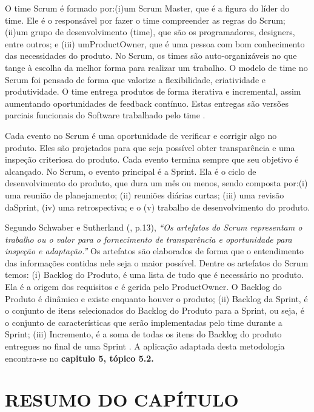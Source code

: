 O time Scrum é formado por:(i)um Scrum Master, que é a figura do líder do time. Ele é o responsável por fazer o time compreender as regras do Scrum; (ii)um grupo de desenvolvimento (time), que são os programadores, designers, entre outros; e (iii) umProductOwner, que é uma pessoa com bom conhecimento das necessidades do produto. No Scrum, os times são auto-organizáveis no que tange à escolha da melhor forma para realizar um trabalho. O modelo de time no Scrum foi pensado de forma que valorize a flexibilidade, criatividade e produtividade.  O time entrega produtos de forma iterativa e incremental, assim aumentando oportunidades de feedback contínuo. Estas entregas são versões parciais funcionais do Software trabalhado pelo time \cite[p. 5-7]{schwaber2013}.

Cada evento no Scrum é uma oportunidade de verificar e corrigir algo no produto. Eles são projetados para que seja possível obter transparência e uma inspeção criteriosa do produto. Cada evento termina sempre que seu objetivo é alcançado. No Scrum, o evento principal é a Sprint. Ela é o ciclo de desenvolvimento do produto, que dura um mês ou menos, sendo composta por:(i) uma reunião de planejamento; (ii) reuniões diárias curtas; (iii) uma revisão daSprint, (iv) uma retrospectiva; e o  (v) trabalho de desenvolvimento do produto.

Segundo Schwaber e Sutherland (\citeyear{schwaber2013}, p.13), \textit{“Os artefatos do Scrum representam o trabalho ou o valor para o fornecimento de transparência e oportunidade para inspeção e adaptação.”} Os artefatos são elaborados de forma que o entendimento das informações contidas nele seja o maior possível. Dentre os artefatos do Scrum temos: (i) Backlog do Produto, é uma lista de tudo que é necessário no produto. Ela é a origem dos requisitos e é gerida pelo ProductOwner. O Backlog do Produto é dinâmico e existe enquanto houver o produto; (ii) Backlog da Sprint, é o conjunto de itens selecionados do Backlog do Produto para a Sprint, ou seja, é o conjunto de características que serão implementadas pelo time durante a Sprint; (iii) Incremento, é a soma de todas os itens do Backlog do produto entregues no final de uma Sprint \cite[p. 13-15]{schwaber2013}. A aplicação adaptada desta metodologia encontra-se no \textbf{capitulo 5, tópico 5.2.}


\section{RESUMO DO CAPÍTULO}

